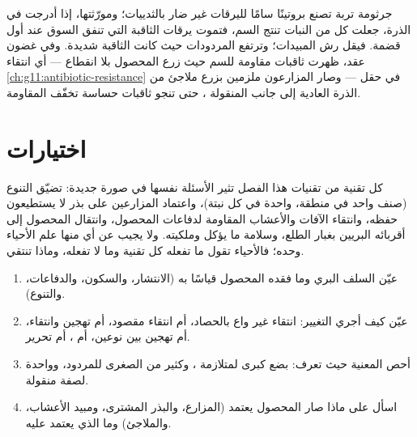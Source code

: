 \begin{example}\label{ex:g12:domesticated-plants:bt}
جرثومة تربة تصنع بروتينًا سامًا لليرقات غير ضار بالثدييات؛ ومورّثتها،
إذا أدرجت في الذرة، جعلت كل  من  النبات تنتج السم، فتموت
يرقات الثاقبة التي تنفق السوق عند أول قضمة. فيقل رش المبيدات؛ وترتفع
المردودات حيث كانت الثاقبة شديدة. وفي غضون عقد، ظهرت ثاقبات مقاومة
للسم حيث زرع المحصول بلا انقطاع --- أي انتقاء
\cref{ch:g11:antibiotic-resistance} في حقل --- وصار المزارعون ملزمين
بزرع ملاجئ من الذرة العادية إلى جانب المنقولة ، حتى تنجو
ثاقبات حساسة تخفّف المقاومة.
\end{example}

\section{اختيارات}

\begin{proposition}\label{prop:g12:domesticated-plants:stakes}
كل تقنية من تقنيات هذا الفصل تثير الأسئلة نفسها في صورة جديدة: تضيّق
التنوع (صنف واحد في منطقة،  واحدة في كل نبتة)، واعتماد المزارعين
على بذر لا يستطيعون حفظه، وانتقاء الآفات والأعشاب المقاومة لدفاعات
المحصول، وانتقال  المحصول إلى أقربائه البريين بغبار الطلع، وسلامة
ما يؤكل وملكيته. ولا يجيب عن أي منها علم الأحياء وحده؛ فالأحياء تقول
ما تفعله كل تقنية وما لا تفعله، وماذا تنتقي.
\end{proposition}
\admitted

\begin{method}\label{met:g12:domesticated-plants:read}
\begin{enumerate}
  \item عيّن السلف البري وما فقده المحصول قياسًا به (الانتشار، والسكون،
        والدفاعات، والتنوع).
  \item عيّن كيف أجري التغيير: انتقاء غير واع بالحصاد، أم انتقاء
        مقصود، أم تهجين وانتقاء، أم تهجين بين نوعين، أم ، أم
        تحرير.
  \item أحص  المعنية حيث تعرف: بضع  كبرى لمتلازمة
        ، وكثير من الصغرى للمردود، وواحدة لصفة منقولة.
  \item اسأل على ماذا صار المحصول يعتمد (المزارع، والبذر المشترى،
        ومبيد الأعشاب، والملاجئ) وما الذي يعتمد عليه.
\end{enumerate}
\end{method}

